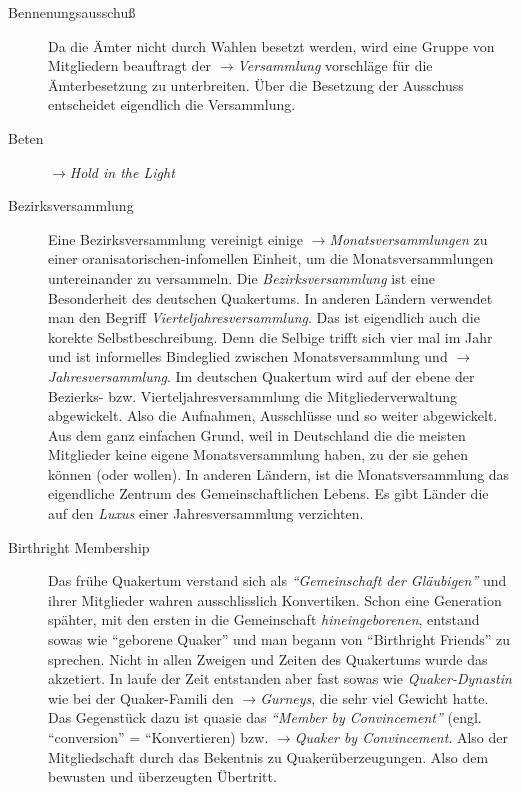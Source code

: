 \begin{description}
 \item[Bennenungsausschuß] Da die Ämter nicht durch Wahlen besetzt werden, wird
eine Gruppe von Mitgliedern beauftragt der $\to$\textit{Versammlung} vorschläge
für die Ämterbesetzung zu unterbreiten. Über die Besetzung der Ausschuss
entscheidet eigendlich die Versammlung. 

 \item[Beten] $\to$\textit{Hold in the Light}
 
 \item[Bezirksversammlung] Eine Bezirksversammlung vereinigt einige
$\to$\textit{Monatsversammlungen} zu einer oranisatorischen-infomellen Einheit,
um die Monatsversammlungen untereinander zu versammeln. Die
\textit{Bezirksversammlung} ist eine Besonderheit des deutschen Quakertums. In
anderen Ländern verwendet man den Begriff \textit{Vierteljahresversammlung}. Das
ist eigendlich auch die korekte Selbstbeschreibung. Denn die Selbige trifft sich
vier mal im Jahr und ist informelles Bindeglied zwischen Monatsversammlung und
$\to$\textit{Jahresversammlung}. Im deutschen Quakertum wird auf der ebene der
Bezierks- bzw. Vierteljahresversammlung die Mitgliederverwaltung abgewickelt.
Also die Aufnahmen, Ausschlüsse und so weiter abgewickelt. Aus dem ganz
einfachen Grund, weil in Deutschland die die meisten Mitglieder keine eigene
Monatsversammlung haben, zu der sie gehen können (oder wollen). In anderen
Ländern, ist die Monatsversammlung das eigendliche Zentrum des
Gemeinschaftlichen Lebens. Es gibt Länder die auf den \textit{Luxus} einer
Jahresversammlung verzichten.
 
 \item[Birthright Membership] Das frühe Quakertum verstand sich als
\textit{"`Gemeinschaft der Gläubigen"'} und ihrer Mitglieder wahren
ausschlisslich Konvertiken. Schon eine Generation spähter, mit den ersten in die
Gemeinschaft \textit{hineingeborenen}, entstand sowas wie "`geborene Quaker"'
und man begann von "`Birthright Friends"' zu sprechen. Nicht in allen Zweigen
und Zeiten des Quakertums wurde das akzetiert. In laufe der Zeit entstanden aber
fast sowas wie \textit{Quaker-Dynastin} wie bei der Quaker-Famili den
$\to$\textit{Gurneys}, die sehr viel Gewicht hatte. Das Gegenstück dazu ist
quasie das \textit{"`Member by Convincement"'} (engl. ``conversion'' =
``Konvertieren) bzw. $\to$\textit{Quaker by Convincement}. Also der
Mitgliedschaft durch das Bekentnis zu Quakerüberzeugungen. Also dem bewusten und
überzeugten Übertritt.
 

\end{description}
